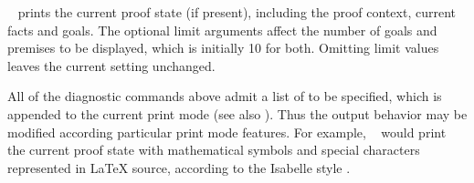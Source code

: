 \begin{isabellebody}
\begin{isamarkuptext}
\begin{description}
  \item \hyperlink{command.pr}{\mbox{}}~ prints the current
  proof state (if present), including the proof context, current facts
  and goals.  The optional limit arguments affect the number of goals
  and premises to be displayed, which is initially 10 for both.
  Omitting limit values leaves the current setting unchanged.

  \end{description}

  All of the diagnostic commands above admit a list of 
  to be specified, which is appended to the current print mode (see
  also \cite{isabelle-ref}).  Thus the output behavior may be modified
  according particular print mode features.  For example, \hyperlink{command.pr}{\mbox{}}~ would print the current proof state
  with mathematical symbols and special characters represented in
  {\LaTeX} source, according to the Isabelle style
  \cite{isabelle-sys}.


\end{isamarkuptext}
\end{isabellebody}
